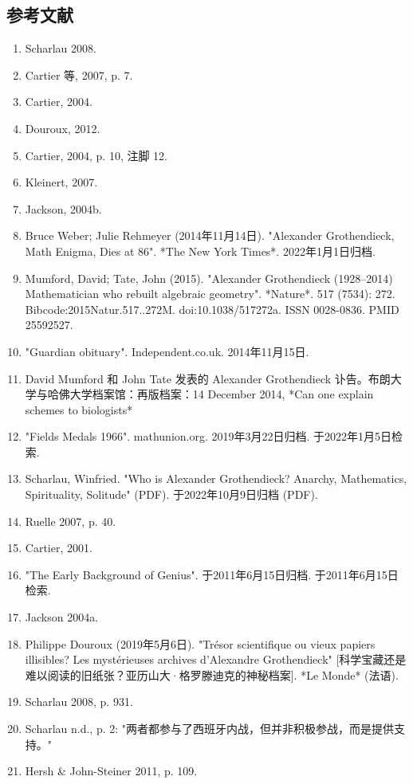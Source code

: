 \subsection{参考文献}  
\begin{enumerate}
\item Scharlau 2008.  
\item Cartier 等, 2007, p. 7.  
\item Cartier, 2004.  
\item Douroux, 2012.  
\item Cartier, 2004, p. 10, 注脚 12.  
\item Kleinert, 2007.  
\item Jackson, 2004b.  
\item Bruce Weber; Julie Rehmeyer (2014年11月14日). "Alexander Grothendieck, Math Enigma, Dies at 86". *The New York Times*. 2022年1月1日归档.  
\item Mumford, David; Tate, John (2015). "Alexander Grothendieck (1928–2014) Mathematician who rebuilt algebraic geometry". *Nature*. 517 (7534): 272. Bibcode:2015Natur.517..272M. doi:10.1038/517272a. ISSN 0028-0836. PMID 25592527.  
\item "Guardian obituary". Independent.co.uk. 2014年11月15日.  
\item David Mumford 和 John Tate 发表的 Alexander Grothendieck 讣告。布朗大学与哈佛大学档案馆：再版档案：14 December 2014, *Can one explain schemes to biologists*  
\item "Fields Medals 1966". mathunion.org. 2019年3月22日归档. 于2022年1月5日检索.  
\item Scharlau, Winfried. "Who is Alexander Grothendieck? Anarchy, Mathematics, Spirituality, Solitude" (PDF). 于2022年10月9日归档 (PDF).  
\item Ruelle 2007, p. 40.  
\item Cartier, 2001.  
\item "The Early Background of Genius". 于2011年6月15日归档. 于2011年6月15日检索.  
\item Jackson 2004a.  
\item Philippe Douroux (2019年5月6日). "Trésor scientifique ou vieux papiers illisibles? Les mystérieuses archives d'Alexandre Grothendieck" [科学宝藏还是难以阅读的旧纸张？亚历山大·格罗滕迪克的神秘档案]. *Le Monde* (法语).
\item Scharlau 2008, p. 931.  
\item Scharlau n.d., p. 2: "两者都参与了西班牙内战，但并非积极参战，而是提供支持。"  
\item Hersh & John-Steiner 2011, p. 109.  

\end{enumerate}
